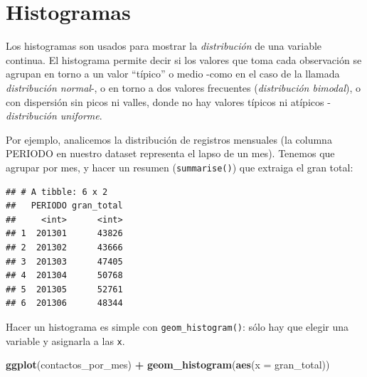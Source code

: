 \documentclass[spanish,]{book}
\newenvironment{Shaded}{\begin{snugshade}}{\end{snugshade}}
\newcommand{\DataTypeTok}[1]{\textcolor[rgb]{0.13,0.29,0.53}{#1}}
\newcommand{\KeywordTok}[1]{\textcolor[rgb]{0.13,0.29,0.53}{\textbf{#1}}}
\newcommand{\NormalTok}[1]{#1}
\newcommand{\OperatorTok}[1]{\textcolor[rgb]{0.81,0.36,0.00}{\textbf{#1}}}
\newcommand{\StringTok}[1]{\textcolor[rgb]{0.31,0.60,0.02}{#1}}
\begin{document}
\hypertarget{histogramas}{%
\section{Histogramas}\label{histogramas}}

Los histogramas son usados para mostrar la \emph{distribución} de una variable continua. El histograma permite decir si los valores que toma cada observación se agrupan en torno a un valor ``típico'' o medio -como en el caso de la llamada \emph{distribución normal}-, o en torno a dos valores frecuentes (\emph{distribución bimodal}), o con dispersión sin picos ni valles, donde no hay valores típicos ni atípicos - \emph{distribución uniforme}.

Por ejemplo, analicemos la distribución de registros mensuales (la columna PERIODO en nuestro dataset representa el lapso de un mes). Tenemos que agrupar por mes, y hacer un resumen (\texttt{summarise()}) que extraiga el gran total:

\begin{Shaded}
\end{Shaded}

\begin{verbatim}
## # A tibble: 6 x 2
##   PERIODO gran_total
##     <int>      <int>
## 1  201301      43826
## 2  201302      43666
## 3  201303      47405
## 4  201304      50768
## 5  201305      52761
## 6  201306      48344
\end{verbatim}

Hacer un histograma es simple con \texttt{geom\_histogram()}: sólo hay que elegir una variable y asignarla a las \texttt{x}.

\begin{Shaded}
\begin{Highlighting}[]
\KeywordTok{ggplot}\NormalTok{(contactos_por_mes) }\OperatorTok{+}\StringTok{ }
\StringTok{    }\KeywordTok{geom_histogram}\NormalTok{(}\KeywordTok{aes}\NormalTok{(}\DataTypeTok{x =}\NormalTok{ gran_total))}
\end{Highlighting}
\end{Shaded}
\end{document}
